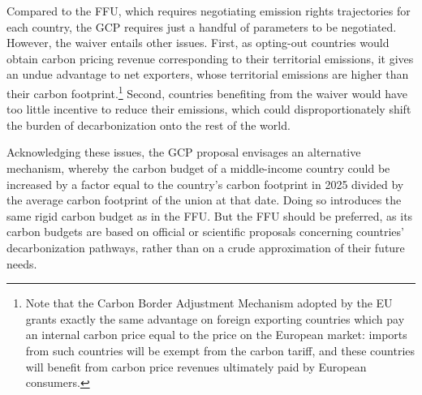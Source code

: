 \documentclass[12pt,english]{article}
\begin{document}
Compared to the FFU, which requires negotiating emission rights trajectories for each country, the GCP requires just a handful of parameters to be negotiated. However, the waiver entails other issues. First, as opting-out countries would obtain carbon pricing revenue corresponding to their territorial emissions, it gives an undue advantage to net exporters, whose territorial emissions are higher than their carbon footprint.\footnote{Note that the Carbon Border Adjustment Mechanism adopted by the EU grants exactly the same advantage on foreign exporting
countries which pay an internal carbon price equal to the price on the European market: imports from such countries will be exempt from the carbon tariff, and these countries will benefit from carbon price revenues ultimately paid by European consumers.} Second, countries benefiting from the waiver would have too little incentive to reduce their emissions, which could disproportionately shift the burden of decarbonization onto the rest of the world. 

Acknowledging these issues, the GCP proposal envisages an alternative mechanism,\cite{fabre_global_2024} whereby the carbon budget of a middle-income country could be increased by a factor equal to the country's carbon footprint in 2025 divided by the average carbon footprint of the union at that date. Doing so introduces the same rigid carbon budget as in the FFU. But the FFU should be preferred, as its carbon budgets are based on official or scientific proposals concerning countries' decarbonization pathways, rather than on a crude approximation of their future needs.
\end{document}
